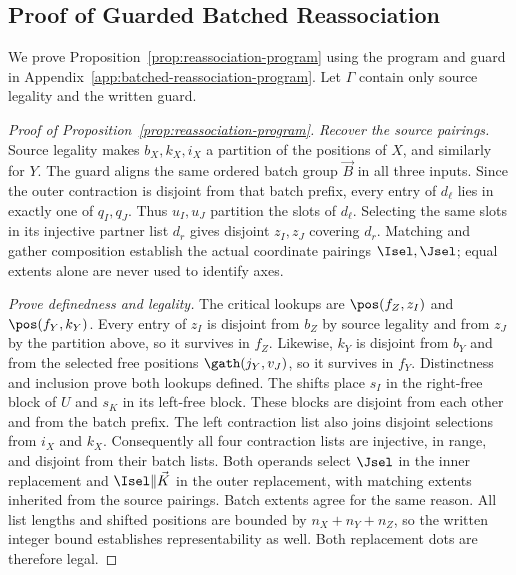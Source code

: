 \subsection{Proof of Guarded Batched Reassociation}
\label{app:reassociation-proof}
We prove Proposition~\ref{prop:reassociation-program} using the program and
guard in Appendix~\ref{app:batched-reassociation-program}. Let $\Gamma$ contain only
source legality and the written guard.

\begin{proof}[Proof of Proposition~\ref{prop:reassociation-program}]
\emph{Recover the source pairings.}
Source legality makes $b_X,k_X,i_X$ a partition of the positions of $X$,
and similarly for $Y$. The guard aligns the same ordered batch group $\vec B$
in all three inputs. Since the outer contraction is disjoint from that
batch prefix, every entry of $d_\ell$ lies in exactly one of $q_I,q_J$.
Thus $u_I,u_J$ partition the slots of $d_\ell$. Selecting the same slots
in its injective partner list $d_r$ gives disjoint $z_I,z_J$ covering
$d_r$. Matching and gather composition establish the actual coordinate
pairings $\Isel,\Jsel$; equal extents alone are never used to identify axes.

\emph{Prove definedness and legality.}
The critical lookups are $\pos(f_Z,z_I)$ and $\pos(f_Y,k_Y)$.
Every entry of $z_I$ is disjoint from $b_Z$ by source legality and from
$z_J$ by the partition above, so it survives in $f_Z$.
Likewise, $k_Y$ is disjoint from $b_Y$ and from the selected free positions
$\gath(j_Y,v_J)$, so it survives in $f_Y$. Distinctness and inclusion
prove both lookups defined. The shifts place $s_I$ in the right-free block
of $U$ and $s_K$ in its left-free block. These blocks are disjoint from
each other and from the batch prefix. The left contraction list also
joins disjoint selections from $i_X$ and $k_X$. Consequently all four
contraction lists are injective, in range, and disjoint from their batch
lists. Both operands select $\Jsel$ in the inner replacement and
$\Isel\Vert \vec K$ in the outer replacement, with matching extents inherited
from the source pairings. Batch extents agree for the same reason.
All list lengths and shifted positions are bounded by $n_X+n_Y+n_Z$,
so the written integer bound establishes representability as well.
Both replacement dots are therefore legal.


\end{proof}
